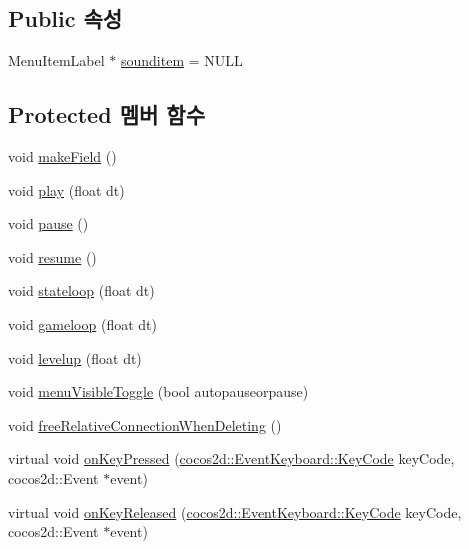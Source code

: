 \subsection*{Public 속성}
\begin{DoxyCompactItemize}
\item 
Menu\+Item\+Label $\ast$ \hyperlink{class_hello_world_adb09915c0ac4077d51f46e2645bc4c0a}{sounditem} = N\+U\+LL
\end{DoxyCompactItemize}
\subsection*{Protected 멤버 함수}
\begin{DoxyCompactItemize}
\item 
void \hyperlink{class_hello_world_ac7cca1564e8be641f0d52b97040c0a69}{make\+Field} ()
\item 
void \hyperlink{class_hello_world_ac1aee383de0a7c30e84f7efc0da8d944}{play} (float dt)
\item 
void \hyperlink{class_hello_world_af72bece97d2fe997936df92723636298}{pause} ()
\item 
void \hyperlink{class_hello_world_ad72b45627fe36ea8cd04b9de431edc7f}{resume} ()
\item 
void \hyperlink{class_hello_world_a4ab71b15b7e362af143d2a539e39a538}{stateloop} (float dt)
\item 
void \hyperlink{class_hello_world_af59f38fb445c1302e5d2f7e18d0ab0e5}{gameloop} (float dt)
\item 
void \hyperlink{class_hello_world_af1590254503ba391a084d767df2dd858}{levelup} (float dt)
\item 
void \hyperlink{class_hello_world_a38047ef68d46872dd39be5d4cc59ad18}{menu\+Visible\+Toggle} (bool autopauseorpause)
\item 
void \hyperlink{class_hello_world_ab2e9dbd1b003e6d26a10a76495efcc2a}{free\+Relative\+Connection\+When\+Deleting} ()
\item 
virtual void \hyperlink{class_hello_world_af2d5a509259a5d0fce7770a38df371d3}{on\+Key\+Pressed} (\hyperlink{_hello_world_scene_8cpp_a29d93764040e709187aa17656a43405d}{cocos2d\+::\+Event\+Keyboard\+::\+Key\+Code} key\+Code, cocos2d\+::\+Event $\ast$event)
\item 
virtual void \hyperlink{class_hello_world_acb7b8934f4697e752182a650a1dc7c3a}{on\+Key\+Released} (\hyperlink{_hello_world_scene_8cpp_a29d93764040e709187aa17656a43405d}{cocos2d\+::\+Event\+Keyboard\+::\+Key\+Code} key\+Code, cocos2d\+::\+Event $\ast$event)
\item 

\end{DoxyCompactItemize}
